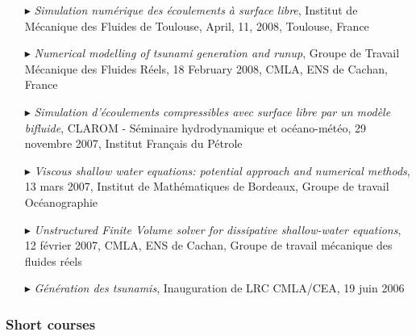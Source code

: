 \begin{itemize}
  \item[$\blacktriangleright$] \textit{Simulation num\'erique des \'ecoulements \`a surface libre}, Institut de M\'ecanique des Fluides de Toulouse, April, 11, 2008, Toulouse, France
  
  \item[$\blacktriangleright$] \textit{Numerical modelling of tsunami generation and runup}, Groupe de Travail M\'ecanique des Fluides R\'eels, 18 February 2008, CMLA, ENS de Cachan, France
  
  \item[$\blacktriangleright$] \textit{Simulation d'\'ecoulements compressibles avec surface libre par un mod\`ele bifluide}, CLAROM - S\'eminaire hydrodynamique et oc\'eano-m\'et\'eo, 29 novembre 2007, Institut Fran\c{c}ais du P\'etrole
  
  \item[$\blacktriangleright$] \textit{Viscous shallow water equations: potential approach and numerical methods}, 13 mars 2007, Institut de Math\'ematiques de Bordeaux, Groupe de travail Oc\'eanographie
  
  \item[$\blacktriangleright$] \textit{Unstructured Finite Volume solver for dissipative shallow-water equations}, 12 f\'evrier 2007, CMLA, ENS de Cachan, Groupe de travail m\'ecanique des fluides r\'eels
  
  \item[$\blacktriangleright$] \textit{G\'en\'eration des tsunamis}, Inauguration de LRC CMLA/CEA, 19 juin 2006
  
\end{itemize}

\separator
\subsubsection{Short courses}

